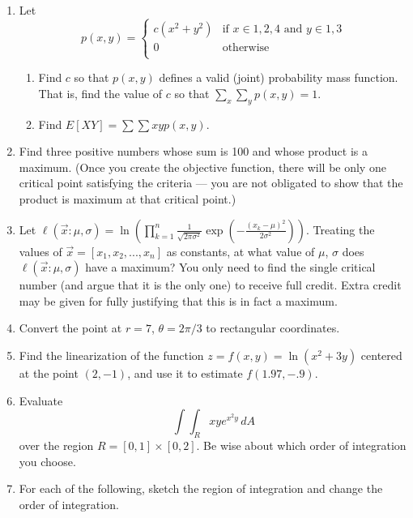\documentclass{article}
\begin{document}
\begin{enumerate}
                    \item Let  $$p(x,y) = \begin{cases} 
                        c(x^2+y^2) & \text{if $x\in {1, 2, 4}$ and $y\in{1, 3}$} \\
                        0 & \text{otherwise} \\
                        \end{cases}
                        $$
                        \begin{enumerate}
                            \item Find $c$ so that $p(x,y)$ defines a valid (joint) probability mass function.  That is, find the value of $c$ so that $\displaystyle \sum_x \sum_y p(x, y) = 1$. 
                            \item Find $\displaystyle E[XY] =\sum\sum xyp(x,y)$.
                        \end{enumerate}
                    \item Find three positive numbers whose sum is 100 and whose product is a maximum. (Once you create the objective function, there will be only one critical point satisfying the criteria --- you are not obligated to show that the product is maximum at that critical point.)
                    \item Let $\displaystyle \ell(\vec{x}:\mu, \sigma) = \ln\left(\prod_{k=1}^{n} \frac{1}{\sqrt{2\pi\sigma^2}}\exp\left(-\frac{(x_k-\mu)^2}{2\sigma^2}\right)\right)$.  Treating the values of $\vec{x} = [x_1, x_2, ..., x_n]$ as constants, at what value of $\mu$, $\sigma$ does $\ell(\vec{x}:\mu, \sigma)$ have a maximum?  You only need to find the single critical number (and argue that it is the only one) to receive full credit. Extra credit may be given for fully justifying that this is in fact a maximum.
                    \item Convert the point at $r=7$, $\theta = 2\pi/3$ to rectangular coordinates.
                    \item Find the linearization of the function $\displaystyle z=f(x,y) = \ln(x^2 +3y)$ centered at the point $(2, -1)$, and use it to estimate $f(1.97, -.9)$. 
         \item Evaluate $$\int\int_R xye^{x^2y}\,dA$$ 
         over the region $R = [0,1]\times [0,2]$. Be wise about which order of integration you choose.
         \item For each of the following, sketch the region of integration and change the order of integration.
         \begin{enumerate}
         

\end{enumerate}
\end{enumerate}
\end{document}
